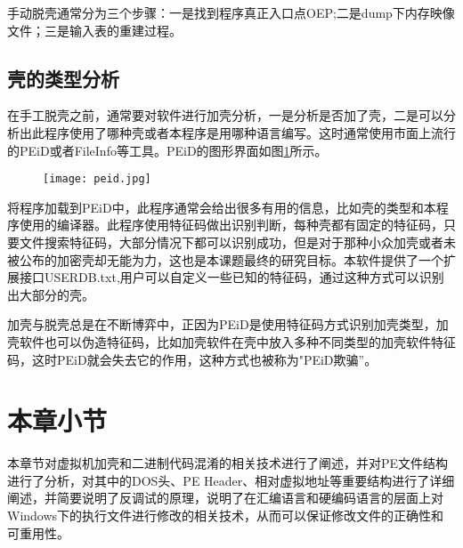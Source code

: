 手动脱壳通常分为三个步骤：一是找到程序真正入口点OEP;二是dump下内存映像文件；三是输入表的重建过程。



\subsection{壳的类型分析}

在手工脱壳之前，通常要对软件进行加壳分析，一是分析是否加了壳，二是可以分析出此程序使用了哪种壳或者本程序是用哪种语言编写。这时通常使用市面上流行的PEiD或者FileInfo等工具。PEiD的图形界面如图\ref{sec2:subsec3:peid}所示。

\begin{figure}[htbp]
	\centering
	\texttt{[image: peid.jpg]}\\
	\label{sec2:subsec3:peid}
\end{figure}

将程序加载到PEiD中，此程序通常会给出很多有用的信息，比如壳的类型和本程序使用的编译器。此程序使用特征码做出识别判断，每种壳都有固定的特征码，只要文件搜索特征码，大部分情况下都可以识别成功，但是对于那种小众加壳或者未被公布的加密壳却无能为力，这也是本课题最终的研究目标。本软件提供了一个扩展接口USERDB.txt,用户可以自定义一些已知的特征码，通过这种方式可以识别出大部分的壳。

加壳与脱壳总是在不断博弈中，正因为PEiD是使用特征码方式识别加壳类型，加壳软件也可以伪造特征码，比如加壳软件在壳中放入多种不同类型的加壳软件特征码，这时PEiD就会失去它的作用，这种方式也被称为"PEiD欺骗”。
\section{本章小节}
本章节对虚拟机加壳和二进制代码混淆的相关技术进行了阐述，并对PE文件结构进行了分析，对其中的DOS头、PE Header、相对虚拟地址等重要结构进行了详细阐述，并简要说明了反调试的原理，说明了在汇编语言和硬编码语言的层面上对Windows下的执行文件进行修改的相关技术，从而可以保证修改文件的正确性和可重用性。
